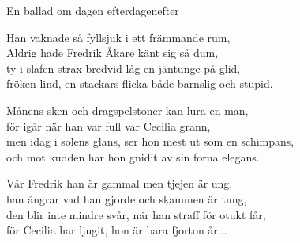 \newpage

\begin{song}{En ballad om dagen efter}{dagenefter}
\begin{vers}
Han vaknade så fyllsjuk i ett främmande rum,\\
Aldrig hade Fredrik Åkare känt sig så dum,\\
ty i slafen strax bredvid låg en jäntunge på glid,\\
fröken lind, en stackars flicka både barnslig och stupid.\\
\end{vers}
\begin{vers}
Månens sken och dragspelstoner kan lura en man,\\
för igår när han var full var Cecilia grann,\\
men idag i solens glans, ser hon mest ut som en schimpans,\\
och mot kudden har hon gnidit av sin forna elegans.\\
\end{vers}
\begin{vers}
Vår Fredrik han är gammal men tjejen är ung,\\
han ångrar vad han gjorde och skammen är tung,\\
den blir inte mindre svår, när han straff för otukt får,\\
för Cecilia har ljugit, hon är bara fjorton år...\\
\end{vers}
\end{song}

